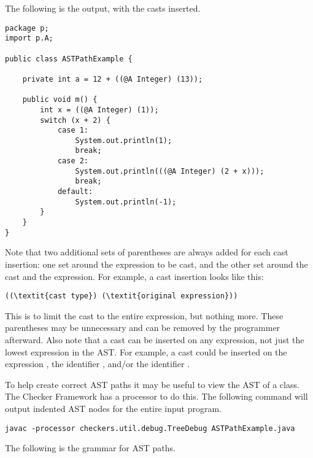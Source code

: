 \documentclass{article}
\newcommand{\code}[1]{\ifmmode{\mbox{\relax\ttfamily{#1}}}\else{\relax\ttfamily #1}\fi}
\begin{document}
The following is the output, with the casts inserted.

\begin{verbatim}
package p;
import p.A;

public class ASTPathExample {

    private int a = 12 + ((@A Integer) (13));

    public void m() {
        int x = ((@A Integer) (1));
        switch (x + 2) {
            case 1:
                System.out.println(1);
                break;
            case 2:
                System.out.println(((@A Integer) (2 + x)));
                break;
            default:
                System.out.println(-1);
        }
    }
}
\end{verbatim}

Note that two additional sets of parentheses are always added for each cast
insertion: one set around the expression to be cast, and the other set around the
cast and the expression. For example, a cast insertion looks like this:

\begin{Verbatim}[commandchars=\\\{\}]
((\textit{cast type}) (\textit{original expression}))
\end{Verbatim}

This is to limit the cast to the entire expression, but
nothing more. These parentheses may be unnecessary and can be removed by the
programmer afterward. Also note that a cast can be inserted on any expression, not
just the lowest expression in the AST. For example, a cast could be inserted on
the expression \code{i + j}, the identifier \code{i}, and/or the identifier \code{j}.

To help create correct AST paths it may be useful to view the AST of a class.
The Checker Framework has a processor to do this. The following command will
output indented AST nodes for the entire input program.

\begin{verbatim}
javac -processor checkers.util.debug.TreeDebug ASTPathExample.java
\end{verbatim}

The following is the grammar for AST paths.
\end{document}
